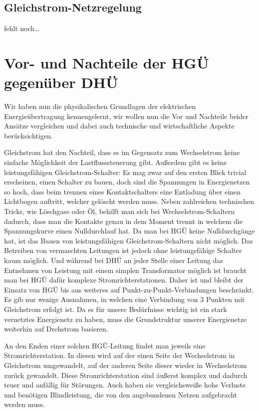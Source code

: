 \documentclass[10pt,a4paper]{article}
\begin{document}
\subsection{Gleichstrom-Netzregelung}
fehlt noch… %

\section{Vor- und Nachteile der HGÜ gegenüber DHÜ}
Wir haben nun die physikalischen Grundlagen der elektrischen Energieübertragung kennengelernt, wir wollen nun die Vor und Nachteile beider Ansätze vergleichen und dabei auch technische und wirtschaftliche Aspekte berücksichtigen.

Gleichstrom hat den Nachteil, dass es im Gegensatz zum Wechselstrom keine einfache Möglichkeit der Lastflusssteuerung gibt.
Außerdem gibt es keine leistungsfähigen Gleichstrom-Schalter:
Es mag zwar auf den ersten Blick trivial erscheinen, einen Schalter zu bauen, doch sind die Spannungen in Energienetzen so hoch, dass beim trennen eines Kontaktschalters eine Entladung über einen Lichtbogen auftritt, welcher gelöscht werden muss. Neben zahlreichen technischen Tricks, wie Löschgase oder Öl, behilft man sich bei Wechselstrom-Schaltern dadurch, dass man die Kontakte genau in dem Moment trennt in welchem die Spannungskurve einen Nulldurchlauf hat. Da man bei HGÜ keine Nulldurchgänge hat, ist das Bauen von leistungsfähigen Gleichstrom-Schaltern nicht möglich. %
Das Betreiben von vermaschten Leitungen ist jedoch ohne leistungsfähige Schalter kaum möglich.\cite{Schymroch} %
Und während bei DHÜ an jeder Stelle einer Leitung das Entnehmen von Leistung mit einem simplen Transformator möglich ist braucht man bei HGÜ dafür komplexe Stromrichterstationen.
Daher ist und bleibt der Einsatz von HGÜ bis aus weiteres auf Punkt-zu-Punkt-Verbindungen beschränkt. Es gib nur wenige Ausnahmen, in welchen eine Verbindung von 3 Punkten mit Gleichstrom erfolgt ist. %
Da es für unsere Bedürfnisse wichtig ist ein stark vernetztes Energienetz zu haben, muss die Grundstruktur %
unserer Energienetze weiterhin auf Drehstrom basieren.

An den Enden einer solchen HGÜ-Leitung findet man jeweils eine Stromrichterstation. In diesen wird auf der einen Seite der Wechselstrom in Gleichstrom umgewandelt, auf der anderen Seite dieser wieder in Wechselstrom zurück gewandelt.
Diese Stromrichterstation sind äußerst komplex und dadurch teuer und anfällig für Störungen. Auch haben sie vergleichsweiße hohe Verluste und benötigen Blindleistung, die von den angebundenen Netzen aufgebracht werden muss.
\end{document}
